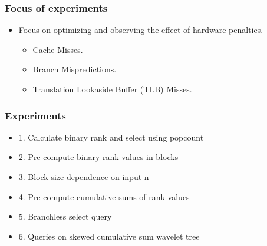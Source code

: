 \documentclass{beamer}
\begin{document}

\begin{frame}
\frametitle{Focus of experiments}
\begin{itemize}
\item Focus on optimizing and observing the effect of hardware penalties.
	\begin{itemize}
	\item Cache Misses.
	\item Branch Mispredictions.
	\item Translation Lookaside Buffer (TLB) Misses.
	\end{itemize}
\end{itemize}
\end{frame}


\begin{frame}
\frametitle{Experiments}
\begin{itemize}
\item 1. Calculate binary rank and select using popcount
\item 2. Pre-compute binary rank values in blocks
\item 3. Block size dependence on input n
\item 4. Pre-compute cumulative sums of rank values
\item 5. Branchless select query
\item 6. Queries on skewed cumulative sum wavelet tree
\end{itemize}
\end{frame}

\end{document}

